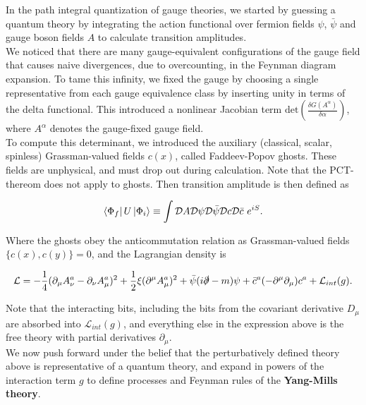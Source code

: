 
\noindent In the path integral quantization of gauge theories, we started by guessing a quantum theory by integrating the action functional over fermion fields $\psi$, $\bar{\psi}$ and gauge boson fields $A$ to calculate transition amplitudes. \\

\noindent We noticed that there are many gauge-equivalent configurations of the gauge field that causes naive divergences, due to overcounting, in the Feynman diagram expansion. To tame this infinity, we fixed the gauge by choosing a single representative from each gauge equivalence class by inserting unity in terms of the delta functional. This introduced a nonlinear Jacobian term  $\text{det} \left( \frac{\delta G(A^\alpha)}{\delta \alpha} \right)$, where $A^\alpha$ denotes the gauge-fixed gauge field. \\

\noindent To compute this determinant, we introduced the auxiliary (classical, scalar, spinless) Grassman-valued fields $c(x)$, called Faddeev-Popov ghosts. These fields are unphysical, and must drop out during calculation. Note that the PCT-thereom does not apply to ghosts. Then transition amplitude is then defined as

\begin{equation}
\bra{\Phi_f} U \ket{\Phi_i} \equiv \int \mathcal{D} A \mathcal{D} \psi \mathcal{D} \bar{\psi} \mathcal{D} c \mathcal{D} \bar{c} \,\, e^{i S}.
\end{equation}

\noindent Where the ghosts obey the anticommutation relation as Grassman-valued fields $\{c(x), c(y)\} = 0$, and the Lagrangian density is

\begin{equation}
\mathcal{L} = -\frac{1}{4} (\partial_\mu A_\nu^a - \partial_\nu A_\mu^a)^2 + \frac{1}{2} \xi (\partial^\mu A_\mu^a)^2 + \bar{\psi} (i \slashed{\partial} - m) \psi + \bar{c}^a (-\partial^\mu \partial_\mu ) c^a + \mathcal{L}_{int} (g) .
\end{equation}

\noindent Note that the interacting bits, including the bits from the covariant derivative $D_\mu$ are absorbed into $\mathcal{L}_{int} (g)$, and everything else in the expression above is the free theory with partial derivatives $\partial_\mu$. \\

\noindent We now push forward under the belief that the perturbatively defined theory above is representative of a quantum theory, and expand in powers of the interaction term $g$ to define processes and Feynman rules of the \textbf{Yang-Mills theory}.

